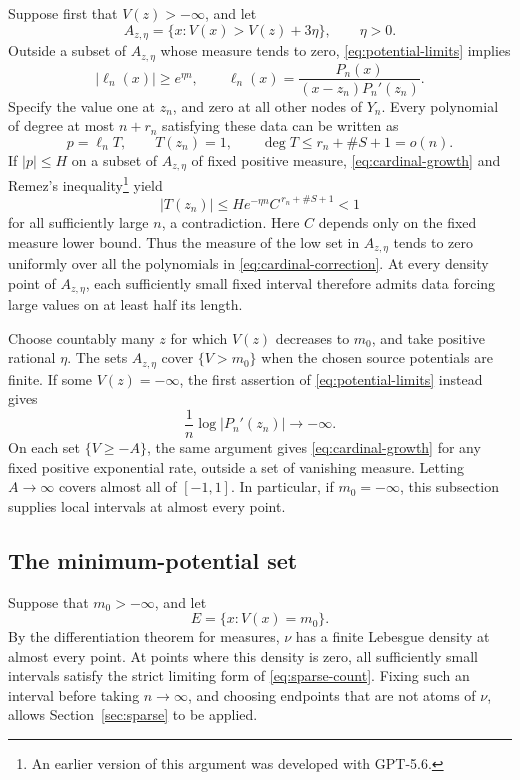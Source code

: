 \documentclass[11pt]{article}
\theoremstyle{definition}
\numberwithin{equation}{section}
\begin{document}
Suppose first that \(V(z)>-\infty\), and let
\[
 A_{z,\eta}=\{x:V(x)>V(z)+3\eta\},\qquad \eta>0.
\]
Outside a subset of \(A_{z,\eta}\) whose measure tends to zero,
\eqref{eq:potential-limits} implies
\begin{equation}\label{eq:cardinal-growth}
 |\ell_n(x)|\ge e^{\eta n},
 \qquad
 \ell_n(x)=\frac{P_n(x)}{(x-z_n)P_n'(z_n)}.
\end{equation}
Specify the value one at \(z_n\), and zero at all other nodes of
\(Y_n\). Every polynomial of degree at most \(n+r_n\) satisfying
these data can be written as
\begin{equation}\label{eq:cardinal-correction}
 p=\ell_n T,\qquad T(z_n)=1,\qquad
 \deg T\le r_n+\#S+1=o(n).
\end{equation}
If \(|p|\le H\) on a subset of \(A_{z,\eta}\) of fixed positive
measure, \eqref{eq:cardinal-growth} and Remez's inequality\footnote{An earlier version of this argument was developed with GPT-5.6.} yield
\[
 |T(z_n)|\le He^{-\eta n}C^{\,r_n+\#S+1}<1
\]
for all sufficiently large \(n\), a contradiction.
Here \(C\) depends only on the fixed measure lower bound.
Thus the measure of the low set in \(A_{z,\eta}\) tends to zero
uniformly over all the polynomials in \eqref{eq:cardinal-correction}.
At every density point of \(A_{z,\eta}\), each sufficiently small
fixed interval therefore admits data forcing large values on at
least half its length.

Choose countably many \(z\) for which \(V(z)\) decreases to \(m_0\),
and take positive rational \(\eta\).
The sets \(A_{z,\eta}\) cover \(\{V>m_0\}\) when the chosen source
potentials are finite.
If some \(V(z)=-\infty\), the first assertion of
\eqref{eq:potential-limits} instead gives
\[
 \frac1n\log|P_n'(z_n)|\longrightarrow-\infty.
\]
On each set \(\{V\ge-A\}\), the same argument gives
\eqref{eq:cardinal-growth} for any fixed positive exponential rate,
outside a set of vanishing measure. Letting \(A\to\infty\) covers
almost all of \([-1,1]\).
In particular, if \(m_0=-\infty\), this subsection supplies local
intervals at almost every point.

\subsection{The minimum-potential set}
\label{subsec:minimum}

Suppose that \(m_0>-\infty\), and let
\[
 E=\{x:V(x)=m_0\}.
\]
By the differentiation theorem for measures, \(\nu\) has a finite
Lebesgue density at almost every point.
At points where this density is zero, all sufficiently small
intervals satisfy the strict limiting form of
\eqref{eq:sparse-count}. Fixing such an interval before taking
\(n\to\infty\), and choosing endpoints that are not atoms of \(\nu\),
allows Section~\ref{sec:sparse} to be applied.
\end{document}
